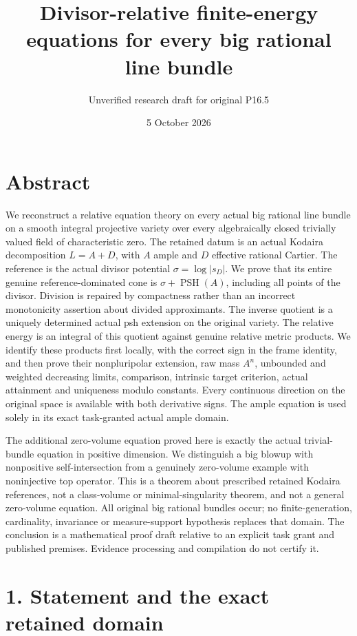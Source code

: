 \documentclass[
  10pt,
]{article}
\title{Divisor-relative finite-energy equations for every big rational
line bundle}
\author{Unverified research draft for original P16.5}
\date{5 October 2026}
\begin{document}
\maketitle

\section{Abstract}\label{abstract}

We reconstruct a relative equation theory on every actual big rational
line bundle on a smooth integral projective variety over every
algebraically closed trivially valued field of characteristic zero. The
retained datum is an actual Kodaira decomposition \(L=A+D\), with \(A\)
ample and \(D\) effective rational Cartier. The reference is the actual
divisor potential \(\sigma=\log|s_D|\). We prove that its entire genuine
reference-dominated cone is \(\sigma+\operatorname{PSH}(A)\), including
all points of the divisor. Division is repaired by compactness rather
than an incorrect monotonicity assertion about divided approximants. The
inverse quotient is a uniquely determined actual psh extension on the
original variety. The relative energy is an integral of this quotient
against genuine relative metric products. We identify these products
first locally, with the correct sign in the frame identity, and then
prove their nonpluripolar extension, raw mass \(A^n\), unbounded and
weighted decreasing limits, comparison, intrinsic target criterion,
actual attainment and uniqueness modulo constants. Every continuous
direction on the original space is available with both derivative signs.
The ample equation is used solely in its exact task-granted actual ample
domain.

The additional zero-volume equation proved here is exactly the actual
trivial-bundle equation in positive dimension. We distinguish a big
blowup with nonpositive self-intersection from a genuinely zero-volume
example with noninjective top operator. This is a theorem about
prescribed retained Kodaira references, not a class-volume or
minimal-singularity theorem, and not a general zero-volume equation. All
original big rational bundles occur; no finite-generation, cardinality,
invariance or measure-support hypothesis replaces that domain. The
conclusion is a mathematical proof draft relative to an explicit task
grant and published premises. Evidence processing and compilation do not
certify it.

\section{1. Statement and the exact retained
domain}\label{statement-and-the-exact-retained-domain}
\end{document}
